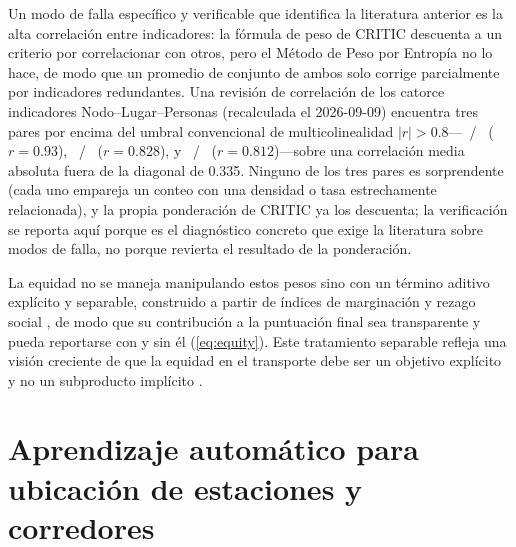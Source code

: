 Un modo de falla específico y verificable que identifica la literatura anterior es la alta
correlación entre indicadores: la fórmula de peso de CRITIC descuenta a un criterio por
correlacionar con otros, pero el Método de Peso por Entropía no lo hace, de modo que un
promedio de conjunto de ambos solo corrige parcialmente por indicadores redundantes. Una
revisión de correlación de los catorce indicadores Nodo--Lugar--Personas (recalculada el
2026-09-09) encuentra tres pares por encima del umbral convencional de multicolinealidad
$|r|>0.8$---~/~ ($r=0.93$),
~/~ ($r=0.828$), y
~/~ ($r=0.812$)---sobre una correlación
media absoluta fuera de la diagonal de \num{0.335}. Ninguno de los tres pares es
sorprendente (cada uno empareja un conteo con una densidad o tasa estrechamente
relacionada), y la propia ponderación de CRITIC ya los descuenta; la verificación se
reporta aquí porque es el diagnóstico concreto que exige la literatura sobre modos de
falla, no porque revierta el resultado de la ponderación.

La equidad no se maneja manipulando estos pesos sino con un término aditivo explícito y
separable, construido a partir de índices de marginación y rezago social
\parencite{conapo_marginacion2020, coneval_rezago2020}, de modo que su contribución a la
puntuación final sea transparente y pueda reportarse con y sin él (\cref{eq:equity}). Este
tratamiento separable refleja una visión creciente de que la equidad en el transporte debe
ser un objetivo explícito y no un subproducto implícito
\parencite{martens2016, pereira2017justice}.

\section{Aprendizaje automático para ubicación de estaciones y corredores}
\label{sec:marco-aprendizaje}

